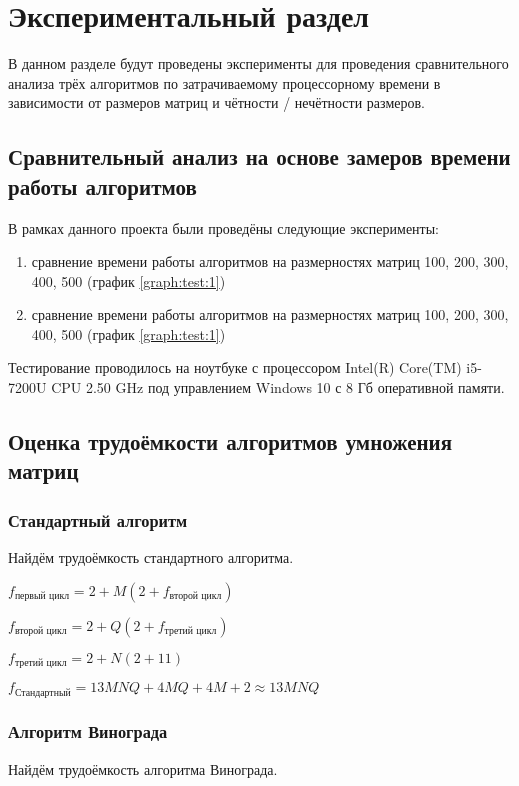 \chapter{Экспериментальный раздел}
\label{cha:research}
    В данном разделе будут проведены эксперименты для проведения 
    сравнительного анализа трёх алгоритмов по затрачиваемому процессорному 
    времени в зависимости от размеров матриц и чётности / нечётности размеров.

    \section{Сравнительный анализ на основе замеров времени работы алгоритмов}
        В рамках данного проекта были проведёны следующие эксперименты:
        \begin{enumerate}
            \item сравнение времени работы алгоритмов на размерностях матриц 100, 200, 300, 400, 500 (график \ref{graph:test:1})
            \item сравнение времени работы алгоритмов на размерностях матриц 100, 200, 300, 400, 500 (график \ref{graph:test:1})
        \end{enumerate}
        
        Тестирование проводилось на ноутбуке с процессором
        Intel(R) Core(TM) i5-7200U CPU 2.50 GHz \cite{processor-i5-7200u}
        под управлением Windows 10 с 8 Гб оперативной памяти.

    \section{Оценка трудоёмкости алгоритмов умножения матриц}

        \subsection{Стандартный алгоритм}
            Найдём трудоёмкость стандартного алгоритма.
            
            $ f_\text{первый цикл} = 2 + M(2 + f_\text{второй цикл})$  

            $ f_\text{второй цикл} = 2 + Q(2 + f_\text{третий цикл})$  

            $ f_\text{третий цикл} = 2 + N(2 + 11)$  

            $ f_\text{Стандартный} = 13MNQ + 4MQ + 4M + 2 \approx 13MNQ$

        \subsection{Алгоритм Винограда}
            Найдём трудоёмкость алгоритма Винограда.
            
